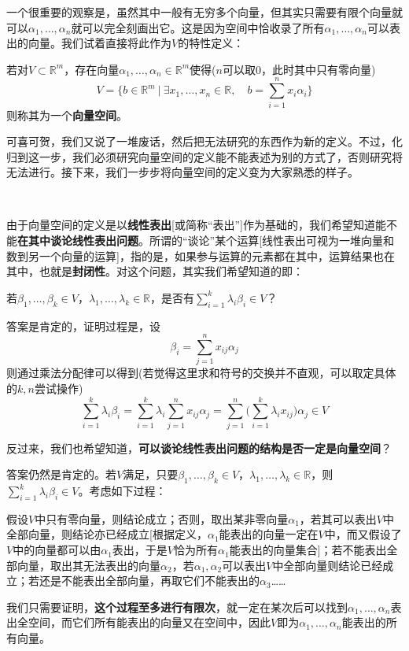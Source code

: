 \documentclass[a4paper,UTF8,fontset=windows]{ctexart}
\newcommand*{\note}{\noindent *}
\begin{document}
一个很重要的观察是，虽然其中一般有无穷多个向量，但其实只需要有限个向量就可以$\alpha_1,\dots,\alpha_n$就可以完全刻画出它。这是因为空间中恰收录了所有$\alpha_1,\dots,\alpha_n$可以表出的向量。我们试着直接将此作为$V$的特性定义：

若对$V\subset\mathbb{R}^m$，存在向量$\alpha_1,\dots,\alpha_n\in\mathbb{R}^m$使得($n$可以取0，此时其中只有零向量)
$$V=\bigg\{b\in\mathbb{R}^m\ \bigg|\ \exists x_1,\dots,x_n\in\mathbb{R},\quad b=\sum_{i=1}^nx_i\alpha_i\bigg\}$$
则称其为一个\textbf{向量空间}。

\note 可喜可贺，我们又说了一堆废话，然后把无法研究的东西作为新的定义。不过，化归到这一步，我们必须研究向量空间的定义能不能表述为别的方式了，否则研究将无法进行。接下来，我们一步步将向量空间的定义变为大家熟悉的样子。

\

由于向量空间的定义是以\textbf{线性表出}[或简称``表出'']作为基础的，我们希望知道能不能\textbf{在其中谈论线性表出问题}。所谓的``谈论''某个运算[线性表出可视为一堆向量和数到另一个向量的运算]，指的是，如果参与运算的元素都在其中，运算结果也在其中，也就是\textbf{封闭性}。对这个问题，其实我们希望知道的即：

若$\beta_1,\dots,\beta_k\in V$，$\lambda_1,\dots,\lambda_k\in\mathbb{R}$，是否有$\sum_{i=1}^k\lambda_i\beta_i\in V$？

答案是肯定的，证明过程是，设
$$\beta_i=\sum_{j=1}^nx_{ij}\alpha_j$$
则通过乘法分配律可以得到(若觉得这里求和符号的交换并不直观，可以取定具体的$k,n$尝试操作)
$$\sum_{i=1}^k\lambda_i\beta_i=\sum_{i=1}^k\lambda_i\sum_{j=1}^nx_{ij}\alpha_j=\sum_{j=1}^n\bigg(\sum_{i=1}^k\lambda_ix_{ij}\bigg)\alpha_j\in V$$

反过来，我们也希望知道，\textbf{可以谈论线性表出问题的结构是否一定是向量空间}？

答案仍然是肯定的。若$V$满足，只要$\beta_1,\dots,\beta_k\in V$，$\lambda_1,\dots,\lambda_k\in\mathbb{R}$，则$\sum_{i=1}^k\lambda_i\beta_i\in V$。考虑如下过程：

假设$V$中只有零向量，则结论成立；否则，取出某非零向量$\alpha_1$，若其可以表出$V$中全部向量，则结论亦已经成立[根据定义，$\alpha_1$能表出的向量一定在$V$中，而又假设了$V$中的向量都可以由$\alpha_1$表出，于是$V$恰为所有$\alpha_1$能表出的向量集合]；若不能表出全部向量，取出其无法表出的向量$\alpha_2$，若$\alpha_1,\alpha_2$可以表出$V$中全部向量则结论已经成立；若还是不能表出全部向量，再取它们不能表出的$\alpha_3$……

我们只需要证明，\textbf{这个过程至多进行有限次}，就一定在某次后可以找到$\alpha_1,\dots,\alpha_n$表出全空间，而它们所有能表出的向量又在空间中，因此$V$即为$\alpha_1,\dots,\alpha_n$能表出的所有向量。
\end{document}
